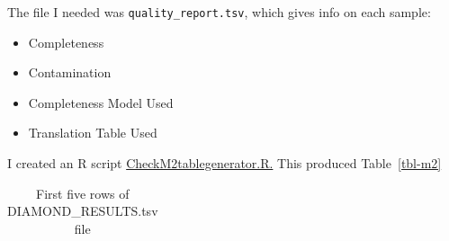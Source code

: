 \documentclass[
  letterpaper,
  DIV=11,
  numbers=noendperiod]{scrreprt}
\begin{document}
The file I needed was \texttt{quality\_report.tsv}, which gives info on
each sample:

\begin{itemize}
\item
  Completeness
\item
  Contamination
\item
  Completeness Model Used
\item
  Translation Table Used
\end{itemize}

I created an R script
\href{https://github.com/tobiasnunn/tnunn_research/blob/main/Research_Experience_Module/00_scripts/Rscripts/CheckM2tablegenerator.R}{CheckM2tablegenerator.R.}
This produced Table~\ref{tbl-m2}

\begin{longtable}[]{@{}
  >{\raggedright\arraybackslash}p{}
  >{\raggedright\arraybackslash}p{}
  >{\raggedleft\arraybackslash}p{}
  >{\raggedleft\arraybackslash}p{}
  >{\raggedleft\arraybackslash}p{}
  >{\raggedleft\arraybackslash}p{}
  >{\raggedleft\arraybackslash}p{}
  >{\raggedleft\arraybackslash}p{}
  >{\raggedleft\arraybackslash}p{}
  >{\raggedleft\arraybackslash}p{}
  >{\raggedleft\arraybackslash}p{}
  >{\raggedleft\arraybackslash}p{}@{}}

\caption{\label{tbl-diamond}First five rows of DIAMOND\_RESULTS.tsv
file}

\tabularnewline


\end{longtable}
\end{document}
